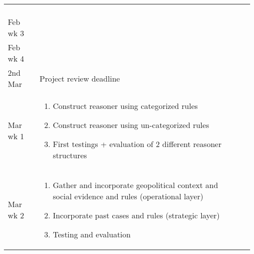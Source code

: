 \begin{table}[]
\begin{tabular}{lll}
\begin{enumerate}
 \end{enumerate} &  \\
Feb wk 3                    &                                                                                   &  \\
Feb wk 4                    &                                                                                &  \\
2nd Mar 					& Project review deadline &  \\
Mar wk 1                    &        
\begin{enumerate}    
	\item Construct reasoner using categorized rules 
	\item Construct reasoner using un-categorized rules
	\item First testings + evaluation of 2 different reasoner structures	
\end{enumerate} &  \\
Mar wk 2                    &	
\begin{enumerate}    
	\item	Gather and incorporate geopolitical context and social evidence and rules (operational layer)
	\item	Incorporate past cases and rules (strategic layer)
	\item Testing and evaluation
\end{enumerate} &  \\


\end{tabular}
\end{table}
